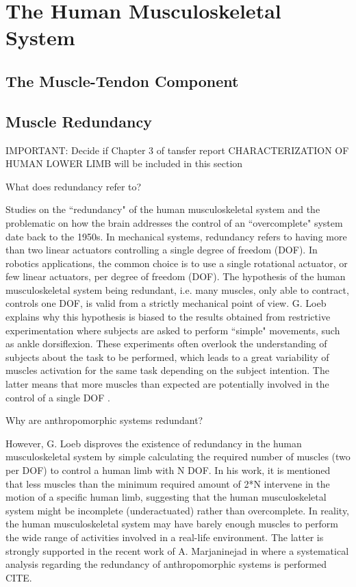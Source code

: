 \section{The Human Musculoskeletal System}

\subsection{The Muscle-Tendon Component}

\subsection{Muscle Redundancy}

IMPORTANT: Decide if Chapter 3 of tansfer report CHARACTERIZATION OF HUMAN LOWER LIMB will be included in this section


What does redundancy refer to?

Studies on the ``redundancy" of the human musculoskeletal system and the problematic on how the brain addresses the control of an ``overcomplete" system date back to the 1950s. In mechanical systems, redundancy refers to having more than two linear actuators controlling a single degree of freedom (DOF). In robotics applications, the common choice is to use a single rotational actuator,  or few linear actuators, per degree of freedom (DOF). The hypothesis of the human musculoskeletal system being redundant, i.e. many muscles, only able to contract, controls one DOF, is valid from a strictly mechanical point of view. G. Loeb explains why this hypothesis is biased to the results obtained from restrictive experimentation where subjects are asked to perform ``simple" movements, such as ankle dorsiflexion. These experiments often overlook the understanding of subjects about the task to be performed, which leads to a great variability of muscles activation for the same task depending on the subject intention. The latter means that more muscles than expected are potentially involved in the control of  a single DOF \cite{loeb2000overcomplete}.

Why are anthropomorphic systems redundant?

However, G. Loeb disproves the existence of redundancy in the human musculoskeletal system by simple calculating the required number of muscles (two per DOF) to control a human limb with N DOF. In his work, it is mentioned that less muscles than the minimum required amount of 2*N intervene in the motion of a specific human limb, suggesting that the human musculoskeletal system might be incomplete (underactuated) rather than overcomplete. In reality, the human musculoskeletal system may have barely enough muscles to perform the wide range of activities involved in a real-life environment. The latter is strongly supported in the recent work of A. Marjaninejad \etal in where a systematical analysis regarding the redundancy of anthropomorphic systems is performed CITE. 



